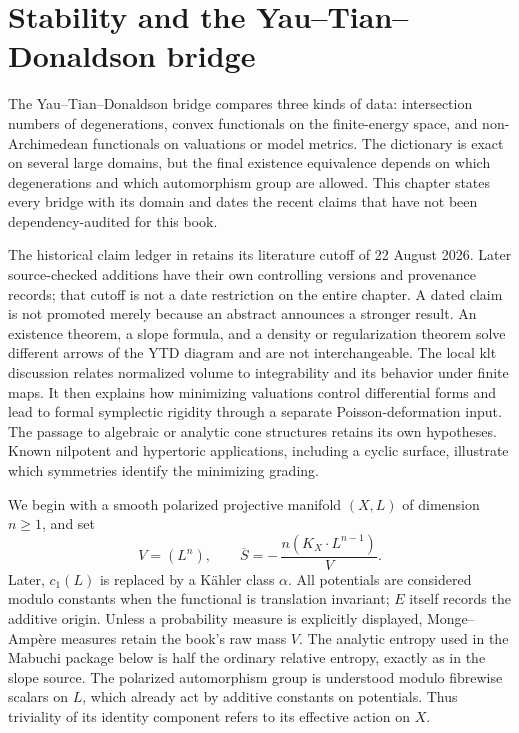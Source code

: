 \chapter{Stability and the Yau--Tian--Donaldson bridge}
\label{chap:ytd-bridge}

The Yau--Tian--Donaldson bridge compares three kinds of data:
intersection numbers of degenerations, convex functionals on the
finite-energy space, and non-Archimedean functionals on valuations or
model metrics. The dictionary is exact on several large domains, but
the final existence equivalence depends on which degenerations and
which automorphism group are allowed. This chapter states every bridge
with its domain and dates the recent claims that have not been
dependency-audited for this book.

The historical claim ledger in  retains its
literature cutoff of 22 August 2026. Later source-checked additions have
their own controlling versions and provenance records; that cutoff is
not a date restriction on the entire chapter. A dated claim is not
promoted merely because an abstract announces a stronger result. An
existence theorem, a slope formula, and a density or regularization
theorem solve different arrows of the YTD diagram and are not
interchangeable. The local klt discussion relates normalized volume to integrability
and its behavior under finite maps. It then explains how minimizing
valuations control differential forms and lead to formal symplectic
rigidity through a separate Poisson-deformation input. The passage
to algebraic or analytic cone structures retains its own hypotheses. Known nilpotent
and hypertoric applications, including a cyclic surface, illustrate
which symmetries identify the minimizing grading.

We begin with a smooth polarized projective manifold $(X,L)$ of
dimension $n\geq1$, and set
\[
                V=(L^n),
        \qquad
                \overline S
        =-\,\frac{n(K_X\cdot L^{n-1})}{V}.
\tag{68.1}\label{eq:ytd-volume-slope}
\]
Later, $c_1(L)$ is replaced by a K\"ahler class $\alpha$.
All potentials are considered modulo constants when the functional is
translation invariant; $E$ itself records the additive origin. Unless a
probability measure is explicitly displayed, Monge--Amp\`ere measures retain
the book's raw mass $V$. The analytic entropy used in the Mabuchi package
below is half the ordinary relative entropy, exactly as in the slope source.
The polarized automorphism group is understood modulo fibrewise scalars
on $L$, which already act by additive constants on potentials. Thus
triviality of its identity component refers to its effective action on $X$.


